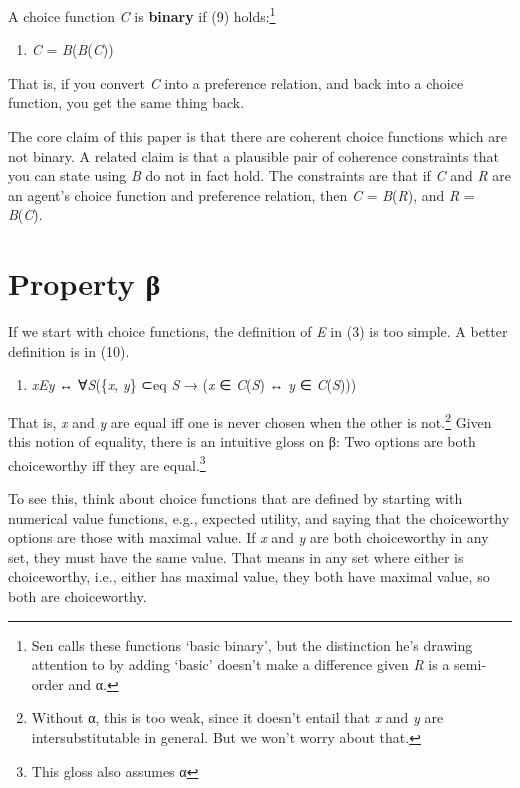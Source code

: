 \documentclass[
  11pt,
  letterpaper,
  DIV=11,
  numbers=noendperiod,
  twoside]{scrartcl}
\providecommand{\tightlist}{%
  \setlength{\itemsep}{0pt}\setlength{\parskip}{0pt}}
\begin{document}
A choice function \emph{C} is \textbf{binary} if (9) holds:\footnote{Sen
  calls these functions `basic binary', but the distinction he's drawing
  attention to by adding `basic' doesn't make a difference given
  \emph{R} is a semi-order and α.}

\begin{enumerate}
\def\labelenumi{(\arabic{enumi})}
\setcounter{enumi}{8}
\tightlist
\item
  \emph{C} = \emph{B}(\emph{B}(\emph{C}))
\end{enumerate}

That is, if you convert \emph{C} into a preference relation, and back
into a choice function, you get the same thing back.

The core claim of this paper is that there are coherent choice functions
which are not binary. A related claim is that a plausible pair of
coherence constraints that you can state using \emph{B} do not in fact
hold. The constraints are that if \emph{C} and \emph{R} are an agent's
choice function and preference relation, then \emph{C} =
\emph{B}(\emph{R}), and \emph{R} = \emph{B}(\emph{C}).

\section{Property β}\label{property-ux3b2}

If we start with choice functions, the definition of \emph{E} in (3) is
too simple. A better definition is in (10).

\begin{enumerate}
\def\labelenumi{(\arabic{enumi})}
\setcounter{enumi}{9}
\tightlist
\item
  \emph{xEy} ↔ ∀\emph{S}(\{\emph{x}, \emph{y}\} ⊂eq \emph{S} → (\emph{x}
  ∈ \emph{C}(\emph{S}) ↔ \emph{y} ∈ \emph{C}(\emph{S})))
\end{enumerate}

That is, \emph{x} and \emph{y} are equal iff one is never chosen when
the other is not.\footnote{Without α, this is too weak, since it doesn't
  entail that \emph{x} and \emph{y} are intersubstitutable in general.
  But we won't worry about that.} Given this notion of equality, there
is an intuitive gloss on β: Two options are both choiceworthy iff they
are equal.\footnote{This gloss also assumes α}

To see this, think about choice functions that are defined by starting
with numerical value functions, e.g., expected utility, and saying that
the choiceworthy options are those with maximal value. If \emph{x} and
\emph{y} are both choiceworthy in any set, they must have the same
value. That means in any set where either is choiceworthy, i.e., either
has maximal value, they both have maximal value, so both are
choiceworthy.
\end{document}
